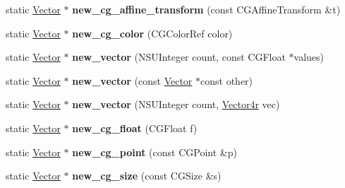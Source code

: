 \begin{DoxyCompactItemize}
\mbox{\label{class_p_o_p_1_1_vector_afa43ee35ac2563816d6afd1119fde2da}} 
static \mbox{\hyperlink{class_p_o_p_1_1_vector}{Vector}} $\ast$ {\bfseries new\+\_\+cg\+\_\+affine\+\_\+transform} (const C\+G\+Affine\+Transform \&t)
\item 
\mbox{\label{class_p_o_p_1_1_vector_a23ab4c6881cc2e2a3693765324582845}} 
static \mbox{\hyperlink{class_p_o_p_1_1_vector}{Vector}} $\ast$ {\bfseries new\+\_\+cg\+\_\+color} (C\+G\+Color\+Ref color)
\item 
\mbox{\label{class_p_o_p_1_1_vector_a5182746936bc76be2379fd56bf1886f3}} 
static \mbox{\hyperlink{class_p_o_p_1_1_vector}{Vector}} $\ast$ {\bfseries new\+\_\+vector} (N\+S\+U\+Integer count, const C\+G\+Float $\ast$values)
\item 
\mbox{\label{class_p_o_p_1_1_vector_aa38f12741747930f96d624b9814c48f3}} 
static \mbox{\hyperlink{class_p_o_p_1_1_vector}{Vector}} $\ast$ {\bfseries new\+\_\+vector} (const \mbox{\hyperlink{class_p_o_p_1_1_vector}{Vector}} $\ast$const other)
\item 
\mbox{\label{class_p_o_p_1_1_vector_ac0deba63d674a73e3ffb035a34125a18}} 
static \mbox{\hyperlink{class_p_o_p_1_1_vector}{Vector}} $\ast$ {\bfseries new\+\_\+vector} (N\+S\+U\+Integer count, \mbox{\hyperlink{struct_p_o_p_1_1_vector4}{Vector4r}} vec)
\item 
\mbox{\label{class_p_o_p_1_1_vector_a2ed7f8dfe5ce34b95c9f48badcc866be}} 
static \mbox{\hyperlink{class_p_o_p_1_1_vector}{Vector}} $\ast$ {\bfseries new\+\_\+cg\+\_\+float} (C\+G\+Float f)
\item 
\mbox{\label{class_p_o_p_1_1_vector_ac3f72f0796ccdcb6af6d608244ce9a74}} 
static \mbox{\hyperlink{class_p_o_p_1_1_vector}{Vector}} $\ast$ {\bfseries new\+\_\+cg\+\_\+point} (const C\+G\+Point \&p)
\item 
\mbox{\label{class_p_o_p_1_1_vector_a93ec118f2dfe53f1d0c77497bcd310ac}} 
static \mbox{\hyperlink{class_p_o_p_1_1_vector}{Vector}} $\ast$ {\bfseries new\+\_\+cg\+\_\+size} (const C\+G\+Size \&s)

\end{DoxyCompactItemize}
